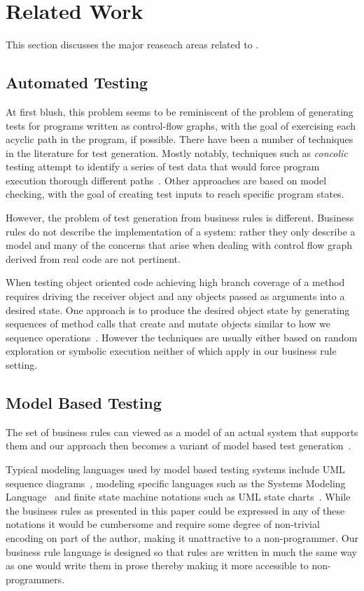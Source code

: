 \section{Related Work}

This section discusses the major reaseach areas related to \tool{}.

\subsection{Automated Testing}

At first blush, this problem seems to be reminiscent of the problem of
generating tests for programs written as control-flow graphs, with the
goal of exercising each acyclic path in the program, if possible.
There have been a number of techniques in the literature for test
generation. Mostly notably, techniques such as \textit{concolic}
testing attempt to identify a series of test data that would force
program execution thorough different paths~\cite{dart, concolic}.  Other
approaches are based on model checking, with the goal of creating test
inputs to reach specific program states.

However, the problem of test generation from business rules is
different. Business rules do not describe the implementation of a
system: rather they only describe a model and many of the concerns
that arise when dealing with control flow graph derived from real code
are not pertinent.

When testing object oriented code achieving high branch coverage of a
method requires driving the receiver object and any objects passed as
arguments into a desired state. One approach is to produce the desired
object state by generating sequences of method calls that create and
mutate objects similar to how we sequence
operations~\cite{pacheco2007,tillmann2008,thummalapenta2011}. However
the techniques are usually either based on random exploration or
symbolic execution neither of which apply in our business rule setting.

\subsection{Model Based Testing}

The set of business rules can viewed as a model of an actual system
that supports them and our approach then becomes a variant of model
based test generation~\cite{utting2012}.

Typical modeling languages used by model based testing systems include
UML sequence diagrams~\cite{nayak2009}, modeling specific languages
such as the Systems Modeling Language~\cite{friedenthal2011} and
finite state machine notations such as UML state
charts~\cite{offhut99}. While the business rules as presented in this
paper could be expressed in any of these notations it would be
cumbersome and require some degree of non-trivial encoding on part of
the author, making it unattractive to a non-programmer. Our business
rule language is designed so that rules are written in much the same
way as one would write them in prose thereby making it more accessible
to non-programmers.

